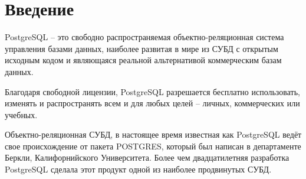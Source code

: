 \section*{Введение}\label{sec:introduction}

PostgreSQL -- это свободно распространяемая объектно-реляционная система управления базами данных, наиболее развитая в мире из СУБД с открытым исходным кодом и являющаяся реальной альтернативой коммерческим базам данных.

Благодаря свободной лицензии, PostgreSQL разрешается бесплатно использовать, изменять и распространять всем и для любых целей -- личных, коммерческих или учебных.

Объектно-реляционная СУБД, в настоящее время известная как PostgreSQL ведёт свое происхождение от пакета POSTGRES, который был написан в департаменте Беркли, Калифорнийского Университета. Более чем двадцатилетняя разработка PostgreSQL сделала этот продукт одной из наиболее продвинутых СУБД.\cite{postgrespro}

\newpage